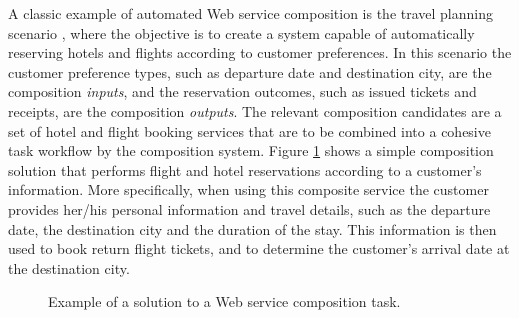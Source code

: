 \documentclass{article}
\begin{document}
A classic example of automated Web service composition is the travel planning scenario \cite{srivastava2003web}, where the objective is to create a system capable of
automatically reserving hotels and flights according to customer preferences. In this scenario the customer preference types, such as departure date and destination
city, are the composition \textit{inputs}, and the reservation outcomes, such as issued tickets and receipts, are the composition \textit{outputs}. The relevant composition
candidates are a set of hotel and flight booking services that are to be combined into a cohesive task workflow by the composition system. Figure \ref{fig:compositionExample} shows a simple composition solution that performs flight and hotel reservations according to a customer's information. More specifically, when using this composite service 
the customer provides her/his personal information and travel details, such as the departure date, the destination city and the duration of the stay. This information is
then used to book return flight tickets, and to determine the customer's arrival date at the destination city.

\begin{figure}
\centerline{
}
\caption{Example of a solution to a Web service composition task.}
\label{fig:compositionExample}
\end{figure}
\end{document}
